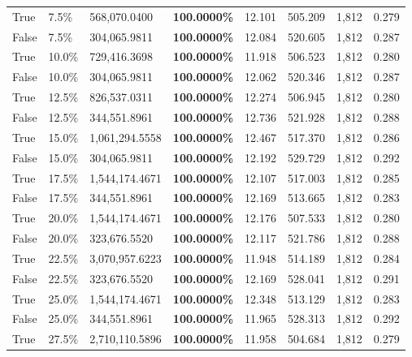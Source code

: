 \begin{table}[H]
\begin{tabular}{lllrllll}
\cline{1-8}
True & 7.5\% & 568,070.0400 & \bfseries \color{red} 100.0000\% & 12.101 & 505.209 & 1,812 & 0.279 \\
\cline{1-8}
False & 7.5\% & \color{red} 304,065.9811 & \bfseries \color{red} 100.0000\% & 12.084 & 520.605 & 1,812 & 0.287 \\
\cline{1-8}
True & 10.0\% & 729,416.3698 & \bfseries \color{red} 100.0000\% & 11.918 & 506.523 & 1,812 & 0.280 \\
\cline{1-8}
False & 10.0\% & \color{red} 304,065.9811 & \bfseries \color{red} 100.0000\% & 12.062 & 520.346 & 1,812 & 0.287 \\
\cline{1-8}
True & 12.5\% & 826,537.0311 & \bfseries \color{red} 100.0000\% & 12.274 & 506.945 & 1,812 & 0.280 \\
\cline{1-8}
False & 12.5\% & 344,551.8961 & \bfseries \color{red} 100.0000\% & 12.736 & 521.928 & 1,812 & 0.288 \\
\cline{1-8}
True & 15.0\% & 1,061,294.5558 & \bfseries \color{red} 100.0000\% & 12.467 & 517.370 & 1,812 & 0.286 \\
\cline{1-8}
False & 15.0\% & \color{red} 304,065.9811 & \bfseries \color{red} 100.0000\% & 12.192 & 529.729 & 1,812 & 0.292 \\
\cline{1-8}
True & 17.5\% & 1,544,174.4671 & \bfseries \color{red} 100.0000\% & 12.107 & 517.003 & 1,812 & 0.285 \\
\cline{1-8}
False & 17.5\% & 344,551.8961 & \bfseries \color{red} 100.0000\% & 12.169 & 513.665 & 1,812 & 0.283 \\
\cline{1-8}
True & 20.0\% & 1,544,174.4671 & \bfseries \color{red} 100.0000\% & 12.176 & 507.533 & 1,812 & 0.280 \\
\cline{1-8}
False & 20.0\% & 323,676.5520 & \bfseries \color{red} 100.0000\% & 12.117 & 521.786 & 1,812 & 0.288 \\
\cline{1-8}
True & 22.5\% & 3,070,957.6223 & \bfseries \color{red} 100.0000\% & 11.948 & 514.189 & 1,812 & 0.284 \\
\cline{1-8}
False & 22.5\% & 323,676.5520 & \bfseries \color{red} 100.0000\% & 12.169 & 528.041 & 1,812 & 0.291 \\
\cline{1-8}
True & 25.0\% & 1,544,174.4671 & \bfseries \color{red} 100.0000\% & 12.348 & 513.129 & 1,812 & 0.283 \\
\cline{1-8}
False & 25.0\% & 344,551.8961 & \bfseries \color{red} 100.0000\% & 11.965 & 528.313 & 1,812 & 0.292 \\
\cline{1-8}
True & 27.5\% & 2,710,110.5896 & \bfseries \color{red} 100.0000\% & 11.958 & 504.684 & 1,812 & 0.279 \\

\end{tabular}
\end{table}
